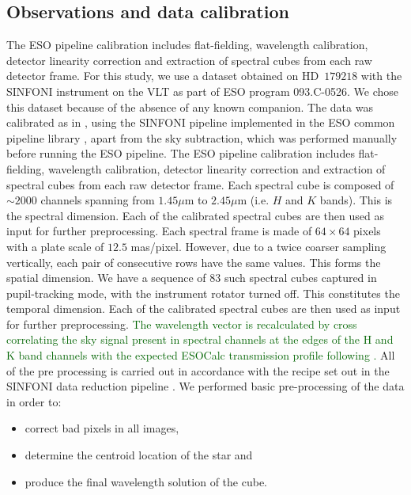 \documentclass[referee]{aa} %
\newcommand{\newchange}[1]{\textcolor{darkgreen}{#1}}
\begin{document}
\subsection{Observations and data calibration}\label{sec:datadesc}
The ESO pipeline calibration includes flat-fielding, wavelength calibration, detector linearity correction and extraction of spectral cubes from each raw detector frame. 
For this study, we use a dataset obtained on HD~$179218$ with the SINFONI instrument on the VLT \citep{2004SINFONI,2003SEisenhauer} as part of ESO program 093.C-0526.
We chose this dataset because of the absence of any known companion.
The data was calibrated as in \citet{2018A&ChristiaensHD142527}, using the SINFONI pipeline implemented in the ESO common pipeline library \citep[EsoRex version 3.10.2;][]{2006Abuter}, apart from the sky subtraction, which was performed manually before running the ESO pipeline.
The ESO pipeline calibration includes flat-fielding, wavelength calibration, detector linearity correction and extraction of spectral cubes from each raw detector frame. 
Each spectral cube is composed of $\sim 2000$ channels spanning from $1.45\mu$m to $2.45 \mu$m (i.e. $H$ and $K$ bands).
This is the spectral dimension.
Each of the calibrated spectral cubes are then used as input for further preprocessing.
Each spectral frame is made of $64\times64$ pixels with a plate scale of $12.5$ mas/pixel. However, due to a twice coarser sampling vertically, each pair of consecutive rows have the same values.
This forms the spatial dimension.
We have a sequence of $83$ such spectral cubes captured in pupil-tracking mode, with the instrument rotator turned off.
This constitutes the temporal dimension.
Each of the calibrated spectral cubes are then used as input for further preprocessing.
\newchange{The wavelength vector is recalculated by cross correlating the sky signal present in spectral channels at the edges of the H and K band channels with the expected ESOCalc transmission profile following \cite{2018AHoeijmakersMM}. }
All of the pre processing is carried out in accordance with the recipe set out in the SINFONI data reduction pipeline \citep{2006Abuter}.
We performed basic pre-processing of the data in order to:
\begin{itemize}
    \item correct bad pixels in all images,
    \item determine the centroid location of the star and
    \item produce the final wavelength solution of the cube. 
\end{itemize}
\end{document}
